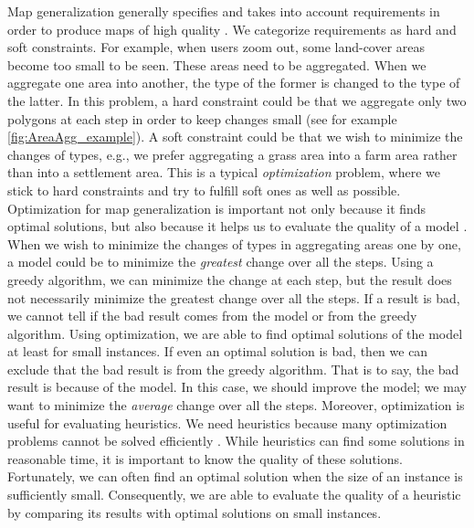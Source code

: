\documentclass[acmsmall,natbib=false]{acmart}
\begin{document}
Map generalization generally specifies 
and takes into account requirements
in order to produce maps of high quality
\parencite{Stoter2009Requirements}.
We categorize requirements as hard and soft constraints.
For example, when users zoom out, 
some land-cover areas become too small to be seen.
These areas need to be aggregated.
When we aggregate one area into another, 
the type of the former is changed to the type of the latter. 
In this problem, a hard constraint could be that 
we aggregate only two polygons at each step 
in order to keep changes small
(see for example \fig\ref{fig:AreaAgg_example}). 
A soft constraint could be that 
we wish to minimize the changes of types, e.g., 
we prefer aggregating a grass area into a farm area 
rather than into a settlement area.
This is a typical \emph{optimization} problem,
where we stick to hard constraints and 
try to fulfill soft ones as well as possible.
Optimization for map generalization is important 
not only because it finds optimal solutions,
but also because it helps us to evaluate the quality of a model
\parencite{Haunert2017Label,
Haunert2008Assuring,Haunert2016Optimization}.
When we wish to minimize the changes of types
in aggregating areas one by one,
a model could be to minimize 
the \emph{greatest} change over all the steps.
Using a greedy algorithm,
we can minimize the change at each step,
but the result does not necessarily minimize the greatest change
over all the steps.
If a result is bad,
we cannot tell if the bad result comes from the model 
or from the greedy algorithm.
Using optimization,
we are able to find optimal solutions
of the model at least for small instances.
If even an optimal solution is bad,
then we can exclude that the bad result 
is from the greedy algorithm.
That is to say,
the bad result is because of the model.
In this case, we should improve the model; 
we may want to minimize 
the \emph{average} change over all the steps.
Moreover, optimization is useful for evaluating heuristics.
We need heuristics because
many optimization problems cannot be solved efficiently
\parencite[e.g.,][]{HaunertWolff2010AreaAgg,Haunert2016Partition}.
While heuristics can find some solutions in reasonable time,
it is important to know the quality of 
these solutions.
Fortunately, we can often find an optimal solution when 
the size of an instance is sufficiently small.
Consequently, we are able to evaluate 
the quality of a heuristic 
by comparing its results with optimal solutions
on small instances.
\end{document}
